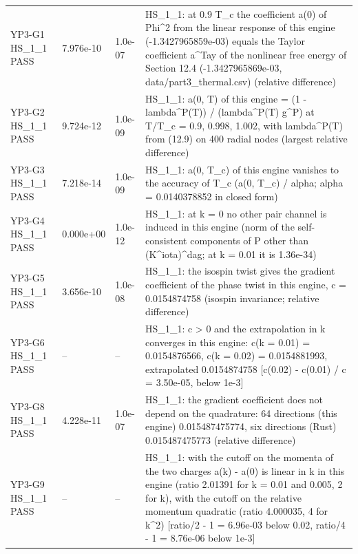 \documentclass[aps,prd,onecolumn,superscriptaddress,nofootinbib,floatfix,longbibliography]{revtex4-2}
\begin{document}
\begin{longtable}{p{}p{}p{}p{}}
YP3-G1 HS\_1\_1 \newline PASS & 7.976e-10 & 1.0e-07 & HS\_1\_1: at 0.9 T\_c the coefficient a(0) of \textbar{}Phi\textbar{}\textasciicircum{}2 from the linear response of this engine (-1.3427965859e-03) equals the Taylor coefficient a\textasciicircum{}Tay of the nonlinear free energy of Section 12.4 (-1.3427965869e-03, data/part3\_thermal.csv) (relative difference) \\
YP3-G2 HS\_1\_1 \newline PASS & 9.724e-12 & 1.0e-09 & HS\_1\_1: a(0, T) of this engine = (1 - lambda\textasciicircum{}P(T)) / (lambda\textasciicircum{}P(T) g\textasciicircum{}P) at T/T\_c = 0.9, 0.998, 1.002, with lambda\textasciicircum{}P(T) from (12.9) on 400 radial nodes (largest relative difference) \\
YP3-G3 HS\_1\_1 \newline PASS & 7.218e-14 & 1.0e-09 & HS\_1\_1: a(0, T\_c) of this engine vanishes to the accuracy of T\_c (\textbar{}a(0, T\_c)\textbar{} / alpha; alpha = 0.0140378852 in closed form) \\
YP3-G4 HS\_1\_1 \newline PASS & 0.000e+00 & 1.0e-12 & HS\_1\_1: at k = 0 no other pair channel is induced in this engine (norm of the self-consistent components of P other than (K\textasciicircum{}iota)\textasciicircum{}dag; at k = 0.01 it is 1.36e-34) \\
YP3-G5 HS\_1\_1 \newline PASS & 3.656e-10 & 1.0e-08 & HS\_1\_1: the isospin twist gives the gradient coefficient of the phase twist in this engine, c = 0.0154874758 (isospin invariance; relative difference) \\
YP3-G6 HS\_1\_1 \newline PASS & -- & -- & HS\_1\_1: c \textgreater{} 0 and the extrapolation in k converges in this engine: c(k = 0.01) = 0.0154876566, c(k = 0.02) = 0.0154881993, extrapolated 0.0154874758 [\textbar{}c(0.02) - c(0.01)\textbar{} / c = 3.50e-05, below 1e-3] \\
YP3-G8 HS\_1\_1 \newline PASS & 4.228e-11 & 1.0e-07 & HS\_1\_1: the gradient coefficient does not depend on the quadrature: 64 directions (this engine) 0.015487475774, six directions (Rust) 0.015487475773 (relative difference) \\
YP3-G9 HS\_1\_1 \newline PASS & -- & -- & HS\_1\_1: with the cutoff on the momenta of the two charges a(k) - a(0) is linear in \textbar{}k\textbar{} in this engine (ratio 2.01391 for k = 0.01 and 0.005, 2 for \textbar{}k\textbar{}), with the cutoff on the relative momentum quadratic (ratio 4.000035, 4 for k\textasciicircum{}2) [\textbar{}ratio/2 - 1\textbar{} = 6.96e-03 below 0.02, \textbar{}ratio/4 - 1\textbar{} = 8.76e-06 below 1e-3] \\

\end{longtable}
\end{document}
